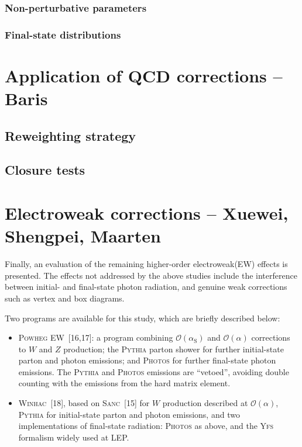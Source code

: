 \subsection{Non-perturbative parameters}

\subsection{Final-state distributions}




\chapter{Application of QCD corrections -- Baris}

\section{Reweighting strategy}

\section{Closure tests}


\chapter{Electroweak corrections -- Xuewei, Shengpei, Maarten}

Finally, an evaluation of the remaining higher-order electroweak(EW) effects is presented.
The effects not addressed by the above studies include the interference
between initial- and final-state photon radiation, and genuine weak
corrections such as vertex and box diagrams.

Two programs are available for this study, which are briefly described below:
\begin{itemize}
  \item \textsc{Powheg} EW~[16,17]: a program combining
  $\mathcal{O}(\alpha_{\mathrm{S}})$ and $\mathcal{O}(\alpha)$ corrections to
  $W$ and $Z$ production; the \textsc{Pythia} parton shower for further initial-state
  parton and photon emissions; and \textsc{Photos} for further final-state photon
  emissions. The \textsc{Pythia} and \textsc{Photos} emissions are ``vetoed'', avoiding
  double counting with the emissions from the hard matrix element.

  \item \textsc{Winhac}~[18], based on \textsc{Sanc}~[15] for $W$ production described at
  $\mathcal{O}(\alpha)$, \textsc{Pythia} for initial-state parton and photon
  emissions, and two implementations of final-state radiation: \textsc{Photos} as
  above, and the \textsc{Yfs} formalism widely used at LEP.
\end{itemize}

